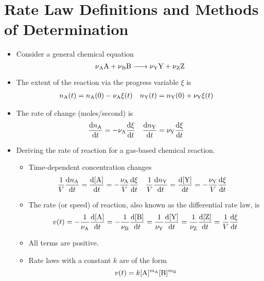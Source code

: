 \documentclass[../notes.tex]{subfiles}
\begin{document}
\section{Rate Law Definitions and Methods of Determination}
\begin{itemize}
    \item {}Consider a general chemical equation
    \begin{equation*}
        \ce{\nu_{\ce{A}}A + \nu_{\ce{B}}B -> \nu_{\ce{Y}}Y + \nu_{\ce{Z}}Z}
    \end{equation*}
    \item The extent of the reaction via the progress variable $\xi$ is
    \begin{align*}
        n_{\ce{A}}(t) &= n_{\ce{A}}(0)-\nu_{\ce{A}}\xi(t)&
        n_{\ce{Y}}(t) &= n_{\ce{Y}}(0)+\nu_{\ce{Y}}\xi(t)
    \end{align*}
    \item The rate of change (moles/second) is
    \begin{align*}
        \dv{n_{\ce{A}}}{t} &= -\nu_{\ce{A}}\dv{\xi}{t}&
        \dv{n_{\ce{Y}}}{t} &= \nu_{\ce{Y}}\dv{\xi}{t}
    \end{align*}
    \item Deriving the rate of reaction for a gas-based chemical reaction.
    \begin{itemize}
        \item Time-dependent concentration changes
        \begin{align*}
            \frac{1}{V}\dv{n_{\ce{A}}}{t} &= \dv{[\ce{A}]}{t} = -\frac{\nu_{\ce{A}}}{V}\dv{\xi}{t}&
            \frac{1}{V}\dv{n_{\ce{Y}}}{t} &= \dv{[\ce{Y}]}{t} = -\frac{\nu_{\ce{Y}}}{V}\dv{\xi}{t}
        \end{align*}
        \item The rate (or speed) of reaction, also known as the differential rate law, is
        \begin{equation*}
            v(t) = -\frac{1}{\nu_{\ce{A}}}\dv{[\ce{A}]}{t}
            = -\frac{1}{\nu_{\ce{B}}}\dv{[\ce{B}]}{t}
            = \frac{1}{\nu_{\ce{Y}}}\dv{[\ce{Y}]}{t}
            = \frac{1}{\nu_{\ce{Z}}}\dv{[\ce{Z}]}{t}
            = \frac{1}{V}\dv{\xi}{t}
        \end{equation*}
        \item All terms are positive.
        \item Rate laws with a constant $k$ are of the form
        \begin{equation*}
            v(t) = k[\ce{A}]^{m_{\ce{A}}}[\ce{B}]^{m_{\ce{B}}}

\end{equation*}
\end{itemize}
\end{itemize}
\end{document}
